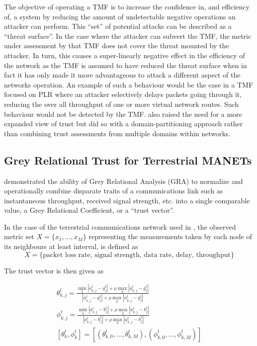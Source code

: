 \documentclass[runningheads,a4paper]{llncs}
\begin{document}
The objective of operating a TMF is to increase the confidence in, and efficiency of, a system by reducing the amount of undetectable negative operations an attacker can perform.
This ``set'' of potential attacks can be described as a ``threat surface''.
In the case where the attacker can subvert the TMF, the metric under assessment by that TMF does not cover the threat mounted by the attacker.
In turn, this causes a super-linearly negative effect in the efficiency of the network as the TMF is assumed to have reduced the threat surface when in fact it has only made it more advantageous to attack a different aspect of the networks operation.
An example of such a behaviour would be the case in a TMF focused on PLR where an attacker selectively delays packets going through it, reducing the over all throughput of one or more virtual network routes.
Such behaviour would not be detected by the TMF.
 \cite{Huang2010a} also raised the need for a more expanded view of trust but did so with a domain-partitioning approach rather than combining trust assessments from multiple domains within networks.

\subsection{Grey Relational Trust for Terrestrial MANETs}

\cite{Guo2012} demonstrated the ability of Grey Relational Analysis (GRA)\cite{Zuo1995} to normalize and operationally combine disparate traits of a communications link such as instantaneous throughput, received signal strength, etc. into a single comparable value, a Grey Relational Coefficient, or a ``trust vector''.

In the case of the terrestrial communications network used in \cite{Guo2012}, the observed metric set $X = \{x_1,\dots,x_M\}$ representing the measurements taken by each node of its neighbours at least interval, is defined as 
\begin{equation}
  \label{eq:terrmetrics}
  X=\{\text{packet loss rate, signal strength, data rate, delay, throughput}\}
\end{equation}

The trust vector is then given as

\begin{align}
  \label{eq:grc}
  \theta_{k,j}^t = \frac{\min_k|a_{k,j}^t - g_j^t| + \rho \max_k|a_{k,j}^t-g_j^t|}{|a_{k,j}^t-g_j^t| + \rho \max_k|a_{k,j}^t-g_j^t|} \\
  \phi_{k,j}^t = \frac{\min_k|a_{k,j}^t - b_j^t| + \rho \max_k|a_{k,j}^t-b_j^t|}{|a_{k,j}^t-b_j^t| + \rho \max_k|a_{k,j}^t-b_j^t|}  \\
  [\theta_k^t, \phi_k^t] = [(\theta_{k,0}^t,\dots,\theta_{k,M}^t),(\phi_{k,0}^t,\dots,\phi_{k,M}^t )]
\end{align}
\end{document}

